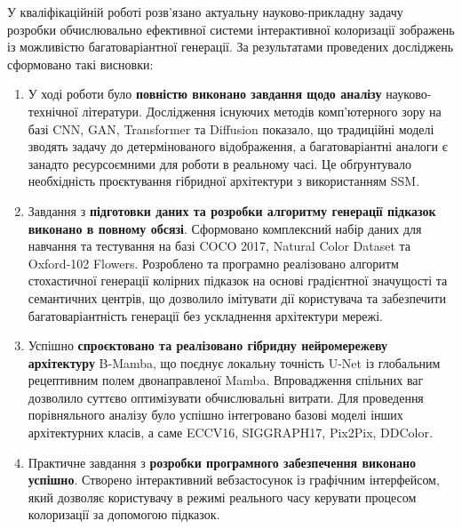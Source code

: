 \conclusions
    У кваліфікаційній роботі розв’язано актуальну науково-прикладну задачу розробки обчислювально ефективної системи інтерактивної колоризації зображень із можливістю багатоваріантної генерації. За результатами проведених досліджень сформовано такі висновки:

    \begin{enumerate}
        \item У ході роботи було \textbf{повністю виконано завдання щодо аналізу} науково-технічної літератури.
            Дослідження існуючих методів комп'ютерного зору на базі CNN, GAN, Transformer та Diffusion показало, що традиційні моделі зводять задачу до детермінованого відображення, а багатоваріантні аналоги є занадто ресурсоємними для роботи в реальному часі.
            Це обґрунтувало необхідність проєктування гібридної архітектури з використанням SSM.

        \item Завдання з \textbf{підготовки даних та розробки алгоритму генерації підказок виконано в повному обсязі}.
            Сформовано комплексний набір даних для навчання та тестування на базі COCO 2017, Natural Color Dataset та Oxford-102 Flowers.
            Розроблено та програмно реалізовано алгоритм стохастичної генерації колірних підказок на основі градієнтної значущості та семантичних центрів, що дозволило імітувати дії користувача та забезпечити багатоваріантність генерації без ускладнення архітектури мережі.

        \item Успішно \textbf{спроєктовано та реалізовано гібридну нейромережеву архітектуру} B-Mamba, що поєднує локальну точність U-Net із глобальним рецептивним полем двонаправленої Mamba.
            Впровадження спільних ваг дозволило суттєво оптимізувати обчислювальні витрати.
            Для проведення порівняльного аналізу було успішно інтегровано базові моделі інших архітектурних класів, а саме ECCV16, SIGGRAPH17, Pix2Pix, DDColor.

        \item Практичне завдання з \textbf{розробки програмного забезпечення виконано успішно}.
            Створено інтерактивний вебзастосунок із графічним інтерфейсом, який дозволяє користувачу в режимі реального часу керувати процесом колоризації за допомогою підказок.


\end{enumerate}
